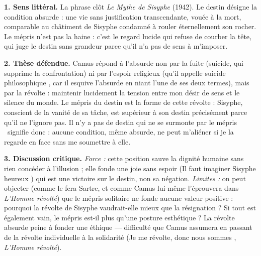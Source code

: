 \documentclass[11pt]{article}
\newcommand{\cle}[1]{{\popxbold\color{popdark}#1}}
\begin{document}
\begin{corrige}
\textbf{1. Sens littéral.} La phrase clôt \emph{Le Mythe de Sisyphe} (1942). Le \guillemotleft destin \guillemotright désigne la condition absurde : une vie sans justification transcendante, vouée à la mort, comparable au châtiment de Sisyphe condamné à rouler éternellement son rocher. Le \guillemotleft mépris \guillemotright n'est pas la haine : c'est le regard lucide qui refuse de courber la tête, qui juge le destin sans grandeur parce qu'il n'a pas de sens à m'imposer.

\textbf{2. Thèse défendue.} Camus répond à l'absurde non par la fuite (suicide, qui supprime la confrontation) ni par l'espoir religieux (qu'il appelle \guillemotleft suicide philosophique \guillemotright, car il esquive l'absurde en niant l'une de ses deux termes), mais par la \cle{révolte} : maintenir lucidement la tension entre mon désir de sens et le silence du monde. Le mépris du destin est la forme de cette révolte : Sisyphe, conscient de la vanité de sa tâche, est supérieur à son destin précisément parce qu'il ne l'ignore pas. \guillemotleft Il n'y a pas de destin qui ne se surmonte par le mépris \guillemotright\ signifie donc : aucune condition, même absurde, ne peut m'aliéner si je la regarde en face sans me soumettre à elle.

\textbf{3. Discussion critique.} \emph{Force :} cette position sauve la dignité humaine sans rien concéder à l'illusion ; elle fonde une joie sans espoir (\guillemotleft Il faut imaginer Sisyphe heureux \guillemotright) qui est une victoire sur le destin, non sa négation. \emph{Limites :} on peut objecter (comme le fera Sartre, et comme Camus lui-même l'éprouvera dans \emph{L'Homme révolté}) que le mépris solitaire ne fonde aucune valeur positive : pourquoi la révolte de Sisyphe vaudrait-elle mieux que la résignation ? Si tout est également vain, le mépris est-il plus qu'une posture esthétique ? La révolte absurde peine à fonder une éthique — difficulté que Camus assumera en passant de la révolte individuelle à la solidarité (\guillemotleft Je me révolte, donc nous sommes \guillemotright, \emph{L'Homme révolté}).
\end{corrige}
\end{document}

